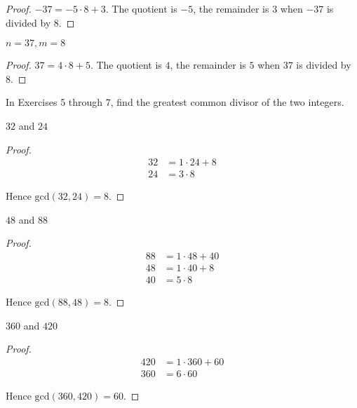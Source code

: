 \begin{proof}
    $-37 = -5\cdot 8 + 3$. The quotient is $-5$, the remainder is $3$ when $-37$ is divided by $8$.
\end{proof}

\begin{exercise}
    $n = 37, m = 8$
\end{exercise}

\begin{proof}
    $37 = 4\cdot 8 + 5$. The quotient is $4$, the remainder is $5$ when $37$ is divided by $8$.
\end{proof}

In Exercises 5 through 7, find the greatest common divisor of the two integers.

\begin{exercise}
    $32$ and $24$
\end{exercise}

\begin{proof}
    \begin{align*}
        32 & = 1\cdot 24 + 8 \\
        24 & = 3\cdot 8
    \end{align*}

    Hence $\text{gcd}(32, 24) = 8$.
\end{proof}

\begin{exercise}
    $48$ and $88$
\end{exercise}

\begin{proof}
    \begin{align*}
        88 & = 1\cdot 48 + 40 \\
        48 & = 1\cdot 40 + 8  \\
        40 & = 5\cdot 8
    \end{align*}

    Hence $\text{gcd}(88, 48) = 8$.
\end{proof}

\begin{exercise}
    $360$ and $420$
\end{exercise}

\begin{proof}
    \begin{align*}
        420 & = 1\cdot 360 + 60 \\
        360 & = 6\cdot 60
    \end{align*}

    Hence $\text{gcd}(360, 420) = 60$.
\end{proof}

